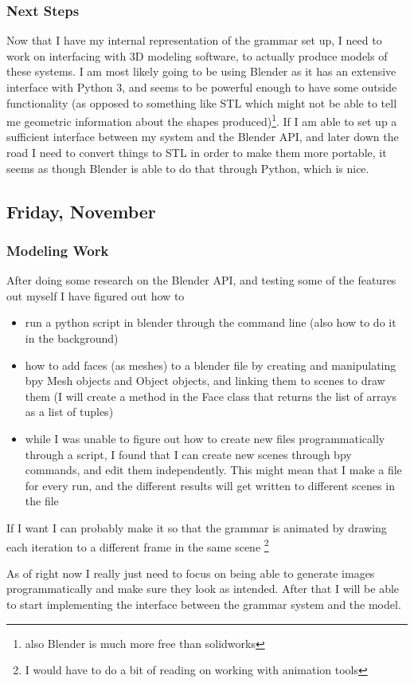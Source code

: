 \documentclass[letterpaper,oneside,titlepage]{article}
\begin{document}
\subsubsection*{Next Steps}
Now that I have my internal representation of the grammar set up, I need to work on interfacing with 3D modeling software, to actually produce models of these systems.  I am most likely going to be using Blender as it has an extensive interface with Python 3, and seems to be powerful enough to have some outside functionality (as opposed to something like STL which might not be able to tell me geometric information about the shapes produced)\footnote{also Blender is much more free than solidworks}.  If I am able to set up a sufficient interface between my system and the Blender API, and later down the road I need to convert things to STL in order to make them more portable, it seems as though Blender is able to do that through Python, which is nice.


\subsection*{Friday, November }

\subsubsection*{Modeling Work}
After doing some research on the Blender API, and testing some of the features out myself I have figured out how to
\begin{itemize}
\item run a python script in blender through the command line (also how to do it in the background)
\item how to add faces (as meshes) to a blender file by creating and manipulating bpy Mesh objects and Object objects, and linking them to scenes to draw them (I will create a method in the Face class that returns the list of arrays as a list of tuples)
\item while I was unable to figure out how to create new files programmatically through a script, I found that I can create new scenes through bpy commands, and edit them independently.  This might mean that I make a file for every run, and the different results will get written to different scenes in the file
\end{itemize}

If I want I can probably make it so that the grammar is animated by drawing each iteration to a different frame in the same scene \footnote{I would have to do a bit of reading on working with animation tools}
\par
As of right now I really just need to focus on being able to generate images programmatically and make sure they look as intended.  After that I will be able to start implementing the interface between the grammar system and the model.
\end{document}
